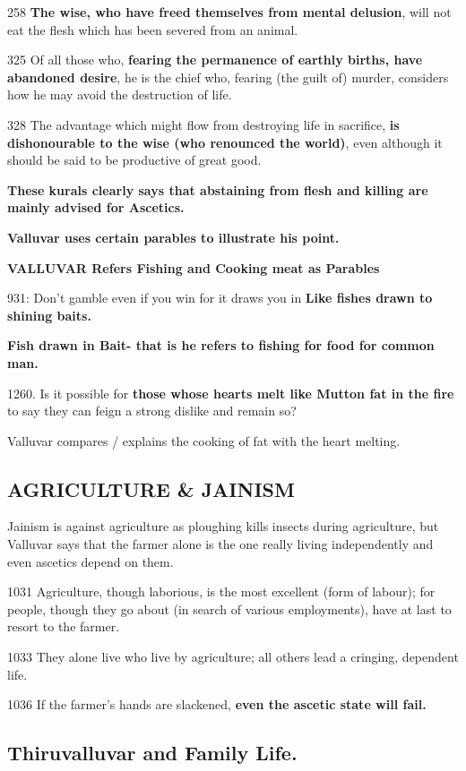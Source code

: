 258 \endnote{}\textbf{The wise, who have freed themselves from mental delusion}, will not eat the flesh which has been severed from an animal.

 325\endnote{} Of all those who, \textbf{fearing the permanence of earthly births, have abandoned desire}, he is the chief who, fearing (the guilt of) murder, considers how he may avoid the destruction of life.

328\endnote{} The advantage which might flow from destroying life in sacrifice, \textbf{is dishonourable to the wise (who renounced the world)}, even although it should be said to be productive of great good.

\textbf{These kurals clearly says that abstaining from flesh and killing are mainly advised for Ascetics.}

\textbf{Valluvar uses certain parables to illustrate his point.}

\textbf{VALLUVAR Refers Fishing and Cooking meat as Parables}

931: Don’t gamble even if you win for it draws you in \textbf{Like fishes drawn to shining baits.}

\textbf{Fish drawn in Bait- that is he refers to fishing for food for common man.}

1260. Is it possible for \textbf{those whose hearts melt like Mutton fat in the fire} to say they can feign a strong dislike and remain so?

Valluvar compares / explains the cooking of fat with the heart melting.


\subsection*{AGRICULTURE \& JAINISM}

Jainism is against agriculture as ploughing kills insects during agriculture, but Valluvar says that the farmer alone is the one really living independently and even ascetics depend on them.

1031\endnote{} Agriculture, though laborious, is the most excellent (form of labour); for people, though they go about (in search of various employments), have at last to resort to the farmer.

1033\endnote{} They alone live who live by agriculture; all others lead a cringing, dependent life.

1036 \endnote{} If the farmer's hands are slackened, \textbf{even the ascetic state will fail.}


\subsection*{Thiruvalluvar and Family Life.}

